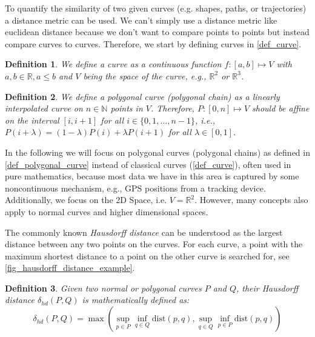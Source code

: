 \documentclass[
oneside,
fontsize=11pt
]{scrartcl}
\newtheorem{mydef}{Definition}
\begin{document}
To quantify the similarity of two given curves (e.g. shapes, paths, or trajectories)
a distance metric can be used. 
We can't simply use a distance metric like euclidean distance 
because we don't want to compare points to points 
but instead compare curves to curves. 
Therefore, we start by defining curves in \autoref{def_curve}.

\begin{mydef}
  \label{def_curve}
  We define a curve as a continuous function $f : [a,b] \mapsto V$ 
  with $a,b \in \mathbb{R}, a \leq b$ and $V$ being the space of the curve,
  e.g., $\mathbb{R}^2$ or $\mathbb{R}^3$.
\end{mydef}

\begin{mydef}
  \label{def_polygonal_curve}
  We define a polygonal curve (polygonal chain) 
  as a linearly interpolated curve 
  on $n \in \mathbb{N}$ points in $V$.
  Therefore, $P : [0,n] \mapsto V$ 
  should be affine on the interval $[i,i+1]$ for all $i \in \{0, 1, \dots, n-1\}$, 
  i.e., $P(i + \lambda) = (1 - \lambda)P(i) + \lambda P(i+1)$ for all $\lambda \in [0,1]$.
\end{mydef}

In the following we will focus on polygonal curves (polygonal chains) 
as defined in \autoref{def_polygonal_curve} 
instead of classical curves (\autoref{def_curve}), often used in pure mathematics, 
because most data we have in this area is 
captured by some noncontinuous mechanism, e.g., GPS positions from a tracking device.
Additionally, we focus on the 2D Space, i.e. $V = \mathbb{R}^2$.
However, many concepts also apply to normal curves and higher dimensional spaces.


The commonly known \textit{Hausdorff distance} can be understood 
as the largest distance between any two points on the curves. 
For each curve, a point with the maximum shortest distance to a point on the other curve is searched for, see \autoref{fig_hausdorff_distance_example}. \cite{alt_computing_1995}


\begin{mydef}
  \label{def_hausdorff_distance}
  Given two normal or polygonal curves $P$ and $Q$, 
  their Hausdorff distance $\delta_{hd}(P,Q)$ is mathematically defined as: 
  $$\delta_{hd}(P,Q) = \max \left( \sup_{p \in P} \inf_{q \in Q} \text{dist}(p,q), \sup_{q \in Q} \inf_{p \in P} \text{dist}(p,q) \right)$$
\end{mydef}
\end{document}
